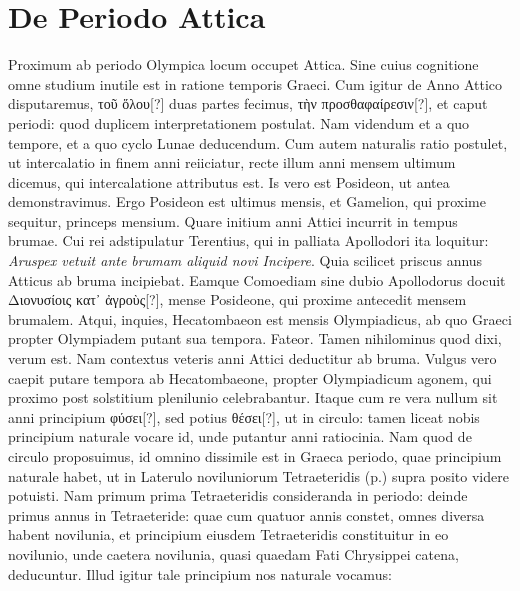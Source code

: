 \section{De Periodo Attica}
Proximum ab periodo Olympica locum occupet Attica.
Sine
cuius cognitione omne studium inutile est in ratione temporis
Graeci.
Cum igitur de Anno Attico disputaremus, \textgreek{τοῦ ὅλου[?]} duas
partes fecimus, \textgreek{τὴν προσθαφαίρεσιν[?]}, et caput periodi:
 quod duplicem
interpretationem postulat.
Nam videndum et a quo tempore, et a quo
cyclo Lunae deducendum.
Cum autem naturalis ratio postulet, ut intercalatio
in finem anni reiiciatur, recte illum anni mensem ultimum
dicemus, qui intercalatione attributus est.
Is vero est Posideon, ut antea
demonstravimus.
Ergo Posideon est ultimus mensis, et Gamelion,
qui proxime sequitur, princeps mensium.
Quare initium
anni Attici incurrit in tempus brumae.
Cui rei adstipulatur Terentius,
qui in palliata Apollodori ita loquitur: \textit{Aruspex vetuit ante brumam
aliquid novi Incipere}.
\emd{} Quia scilicet priscus annus Atticus
ab bruma incipiebat.
Eamque Comoediam sine dubio Apollodorus
docuit \textgreek{Διονυσίοις κατ᾽ ἀγροὺς[?]}, mense Posideone,
 qui proxime antecedit
mensem brumalem.
Atqui, inquies, Hecatombaeon est mensis
Olympiadicus, ab quo Graeci propter Olympiadem putant sua
tempora.
Fateor.
Tamen nihilominus quod dixi, verum est.
Nam
contextus veteris anni Attici deductitur ab bruma.
Vulgus vero caepit
putare tempora ab Hecatombaeone, propter Olympiadicum agonem,
qui proximo post solstitium plenilunio celebrabantur.
Itaque cum re
vera nullum sit anni principium \textgreek{φύσει[?]},
 sed potius \textgreek{θέσει[?]}, ut in circulo:
tamen liceat nobis principium naturale vocare id, unde putantur anni
ratiocinia.
Nam quod de circulo proposuimus, id omnino dissimile
est in Graeca periodo, quae principium naturale habet, ut in Laterulo
noviluniorum Tetraeteridis (p.\pageref{tab:p027})
 supra posito videre potuisti.
Nam primum
prima Tetraeteridis consideranda in periodo: deinde primus annus
in Tetraeteride: quae cum quatuor annis constet, omnes diversa
habent novilunia, et principium eiusdem Tetraeteridis constituitur
in eo novilunio, unde caetera novilunia, quasi quaedam Fati Chrysippei
catena, deducuntur.
%
Illud igitur tale principium nos naturale vocamus:
